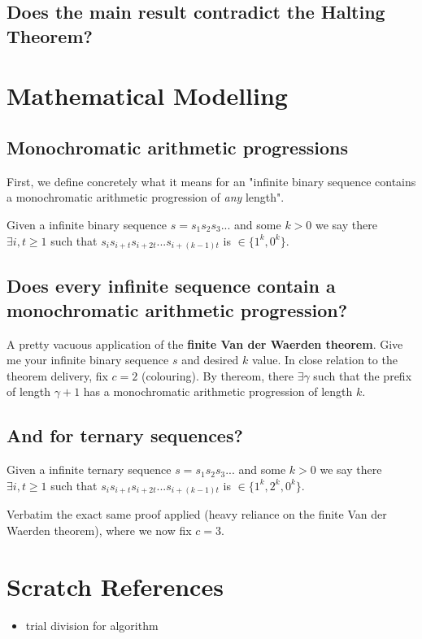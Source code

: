 \documentclass{article}
\begin{document}
\subsection{Does the main result contradict the Halting Theorem?}


\section{Mathematical Modelling}
\subsection{Monochromatic arithmetic progressions}
First, we define concretely what it means for an "infinite binary sequence contains a monochromatic arithmetic progression of \emph{any} length". 

Given a infinite binary sequence $s = s_{1}s_{2}s_{3}...$ and some $k>0$ we say there $\exists i,t \geq 1$ such that $s_{i}s_{i+t}s_{i+2t}...s_{i+(k-1)t}$ is $\in \{1^k,0^k\}$.

\subsection{Does every infinite sequence contain a monochromatic arithmetic progression?}
A pretty vacuous application of the \textbf{finite Van der Waerden theorem}. Give me your infinite binary sequence $s$ and desired $k$ value. In close relation to the theorem delivery, fix $c = 2$ (colouring). By thereom, there $\exists \gamma$ such that the prefix of length $\gamma + 1$ has a monochromatic arithmetic progression of length $k$.

\subsection{And for ternary sequences?} 
Given a infinite ternary sequence $s = s_{1}s_{2}s_{3}...$ and some $k>0$ we say there $\exists i,t \geq 1$ such that $s_{i}s_{i+t}s_{i+2t}...s_{i+(k-1)t}$ is $\in \{1^k,2^k,0^k\}$.

Verbatim the exact same proof applied (heavy reliance on the finite Van der Waerden theorem), where we now fix $c = 3$.

\section{Scratch References}
\begin{itemize}
	\item trial division for algorithm
\end{itemize}
\end{document}

